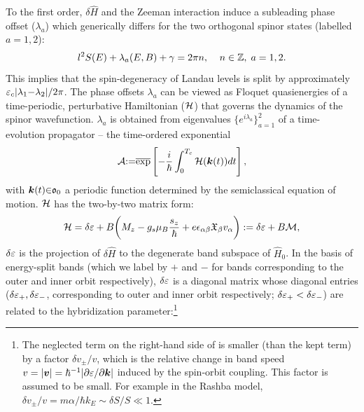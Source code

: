 \documentclass[aps, prb, showpacs, twocolumn, notitlepage, superscriptaddress]{revtex4-1}
\begin{document}

To the first order, $\delta \hat{H}$ and the Zeeman interaction induce a subleading phase offset ($\lambda_a$) which generically differs for the two orthogonal spinor states (labelled $a{=}1,2$):
\begin{equation}
l^2S(E)+\lambda_a(E,B)+\gamma=2\pi n,\;\;\;\;  n\in \mathbb{Z},\;a=1,2. \label{eq:rule}
\end{equation}
This implies that the spin-degeneracy of Landau levels is split   by approximately  $\varepsilon_c|\lambda_1{-}\lambda_2|/2\pi$. The phase offsets $\lambda_a$ can be viewed as Floquet quasienergies of a time-periodic, perturbative Hamiltonian (${\cal H}$) that governs the dynamics of the spinor wavefunction.  $\lambda_a$ is obtained  from  eigenvalues $\{e^{i\lambda_a}\}_{a=1}^2$ of a time-evolution propagator -- the time-ordered exponential 
\begin{equation}
{\cal A}{:}{=}\overline{\exp}\left[-\frac{i}{\hbar}\int_0^{T_c} {\cal H}(\boldsymbol{k}(t)) dt\right],
\label{eq:prop}
\end{equation} 
with $\boldsymbol{k}(t){\in}\mathfrak{o}_0$ a periodic function determined by the semiclassical equation of motion.   ${\cal H}$ has the two-by-two matrix form:
\begin{equation}
  {\cal H}=\delta \varepsilon +B\bigg(M_z -g_s\mu_{B}\frac{s_z}{\hbar} + e\epsilon_{\alpha\beta}\mathfrak{X}_{\beta}v_{\alpha}\bigg):=\delta \varepsilon+B{\cal M},\label{eq:H1}
\end{equation}
$\delta \varepsilon$ is the projection of $\delta \hat{H}$ to the degenerate band subspace of $\hat{H}_0$. In the basis of energy-split bands (which we label by ${+}$ and $-$ for bands corresponding to the outer and inner orbit respectively), $\delta \varepsilon$ is a diagonal matrix whose diagonal entries ($\delta \varepsilon_+,\delta \varepsilon_-$, corresponding to outer and inner orbit respectively; $\delta \varepsilon_+<\delta \varepsilon_-$) are related to the hybridization parameter:\footnote{The neglected term on the right-hand side of   is smaller (than the kept term) by a factor $\delta v_{\pm}/v$, which is the relative change in band speed $v=|\boldsymbol{v}|=\hbar^{-1}|\partial \varepsilon/\partial \boldsymbol{k}|$ induced by the spin-orbit coupling. This factor is assumed to be small.  For example in the Rashba model, $\delta v_{\pm}/v=m\alpha/\hbar k_E{\sim}\delta S/S{\ll}1$.}   
\end{document}
